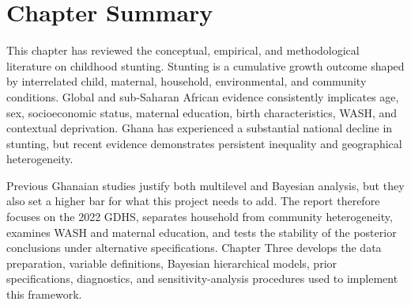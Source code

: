 \section{Chapter Summary}

This chapter has reviewed the conceptual, empirical, and methodological literature on childhood stunting. Stunting is a cumulative growth outcome shaped by interrelated child, maternal, household, environmental, and community conditions. Global and sub-Saharan African evidence consistently implicates age, sex, socioeconomic status, maternal education, birth characteristics, WASH, and contextual deprivation. Ghana has experienced a substantial national decline in stunting, but recent evidence demonstrates persistent inequality and geographical heterogeneity.

Previous Ghanaian studies justify both multilevel and Bayesian analysis, but they also set a higher bar for what this project needs to add. The report therefore focuses on the 2022 GDHS, separates household from community heterogeneity, examines WASH and maternal education, and tests the stability of the posterior conclusions under alternative specifications. Chapter Three develops the data preparation, variable definitions, Bayesian hierarchical models, prior specifications, diagnostics, and sensitivity-analysis procedures used to implement this framework.
